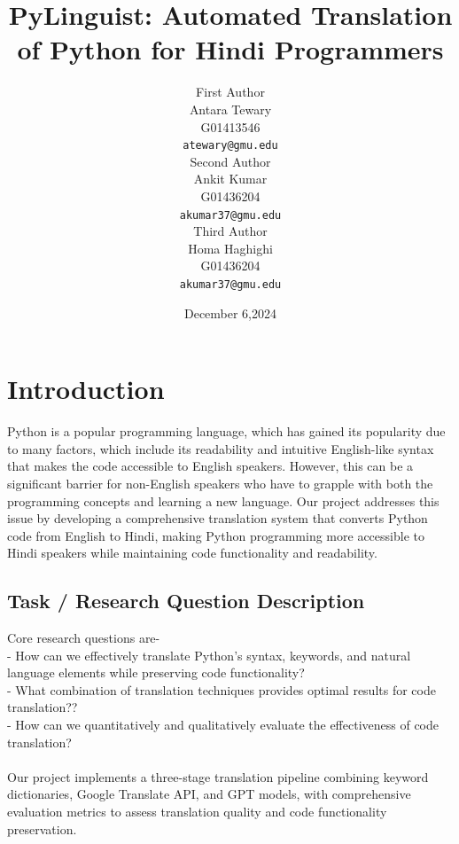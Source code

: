 \documentclass[11pt,a4paper]{article}
\title{PyLinguist: Automated Translation of Python for Hindi Programmers}
\author{First Author \\
  Antara Tewary\\ 
  G01413546\\
  \texttt{atewary@gmu.edu} \\\And
  Second Author \\
  Ankit Kumar\\ 
  G01436204\\
  \texttt{akumar37@gmu.edu}\\\And
  Third Author \\
  Homa Haghighi\\ 
  G01436204\\
  \texttt{akumar37@gmu.edu}}
\date{December 6,2024}
\begin{document}
\maketitle

\section{Introduction}
Python is a popular programming language, which has gained its popularity due to many factors, which include its readability and intuitive English-like syntax that makes the code accessible to English speakers. However, this can be a significant barrier for non-English speakers who have to grapple with both the programming concepts and learning a new language. Our project addresses this issue by developing a comprehensive translation system that converts Python code from English to Hindi, making Python programming more accessible to Hindi speakers while maintaining code functionality and readability.
            \subsection{Task / Research Question Description} 
            Core research questions are-\\
            - How can we effectively translate Python's syntax, keywords, and natural language elements while preserving code functionality?\\
            - What combination of translation techniques provides optimal results for code translation??\\
            - How can we quantitatively and qualitatively evaluate the effectiveness of code translation?\\ \\
            Our project implements a three-stage translation pipeline combining keyword dictionaries, Google Translate API, and GPT models, with comprehensive evaluation metrics to assess translation quality and code functionality preservation.
\end{document}

